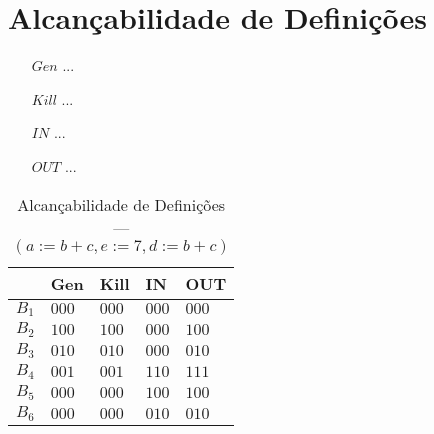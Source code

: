 \section{Alcan\c{c}abilidade de Defini\c{c}\~oes}

\begin{itemize}
  \item[$Gen$] ...
  \item[$Kill$] ...
  \item[$IN$] ...
  \item[$OUT$] ...
\end{itemize}

\begin{table}[ht]
\centering
\begin{tabular}{l|l|l|l|l}
	& Gen & Kill & IN & OUT\\
\hline
$B_{1}$ &  $000$ & $000$ & $000$ & $000$\\
$B_{2}$ &  $100$ & $100$ & $000$ & $100$\\
$B_{3}$ &  $010$ & $010$ & $000$ & $010$\\
$B_{4}$ &  $001$ & $001$ & $110$ & $111$\\
$B_{5}$ &  $000$ & $000$ & $100$ & $100$\\
$B_{6}$ &  $000$ & $000$ & $010$ & $010$\\
\end{tabular}
\caption{Alcan\c{c}abilidade de Defini\c{c}\~oes --- $(a:=b+c, e:=7, d:=b+c)$}
\end{table}

